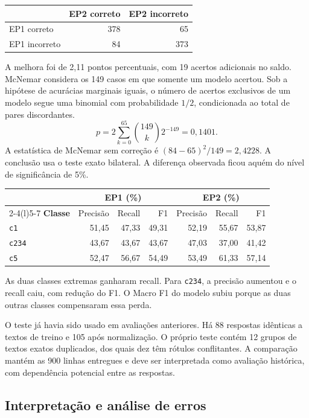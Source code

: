 \documentclass[11pt,a4paper]{article}
\begin{document}
\begingroup\small
\begin{longtable}{@{}lrr@{}}
\toprule
 & \textbf{EP2 correto} & \textbf{EP2 incorreto}\\
\midrule
EP1 correto & 378 & 65\\
EP1 incorreto & 84 & 373\\
\bottomrule
\end{longtable}
\endgroup

A melhora foi de 2,11 pontos percentuais, com 19 acertos adicionais no saldo. McNemar considera os 149 casos em que somente um modelo acertou. Sob a hipótese de acurácias marginais iguais, o número de acertos exclusivos de um modelo segue uma binomial com probabilidade $1/2$, condicionada ao total de pares discordantes.
\[
p = 2\sum_{k=0}^{65} \binom{149}{k}2^{-149} = 0{,}1401.
\]
A estatística de McNemar sem correção é $(84-65)^2/149 = 2{,}4228$. A conclusão usa o teste exato bilateral. A diferença observada ficou aquém do nível de significância de 5\%.

\begingroup\small
\begin{longtable}{@{}lrrrrrr@{}}
\toprule
& \multicolumn{3}{c}{\textbf{EP1 (\%)}} & \multicolumn{3}{c}{\textbf{EP2 (\%)}}\\
\cmidrule(lr){2-4}\cmidrule(l){5-7}
\textbf{Classe} & Precisão & Recall & F1 & Precisão & Recall & F1\\
\midrule
\nolinkurl{c1} & 51,45 & 47,33 & 49,31 & 52,19 & 55,67 & 53,87\\
\nolinkurl{c234} & 43,67 & 43,67 & 43,67 & 47,03 & 37,00 & 41,42\\
\nolinkurl{c5} & 52,47 & 56,67 & 54,49 & 53,49 & 61,33 & 57,14\\
\bottomrule
\end{longtable}
\endgroup

As duas classes extremas ganharam recall. Para \nolinkurl{c234}, a precisão aumentou e o recall caiu, com redução do F1. O Macro F1 do modelo subiu porque as duas outras classes compensaram essa perda.

O teste já havia sido usado em avaliações anteriores. Há 88 respostas idênticas a textos de treino e 105 após normalização. O próprio teste contém 12 grupos de textos exatos duplicados, dos quais dez têm rótulos conflitantes. A comparação mantém as 900 linhas entregues e deve ser interpretada como avaliação histórica, com dependência potencial entre as respostas.

\clearpage
\subsection{Interpretação e análise de erros}
\end{document}
